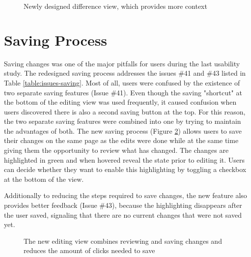 \begin{figure}[h!]
 \centering
 \caption{Newly designed difference view, which provides more context}
 \label{fig:diff-split}
\end{figure}

\section{Saving Process}
Saving changes was one of the major pitfalls for users during the last usability study. The redesigned saving process addresses the issues \#41 and \#43 listed in Table \ref{table:issues-saving}. Most of all, users were confused by the existence of two separate saving features (Issue \#41). Even though the saving "shortcut" at the bottom of the editing view was used frequently, it caused confusion when users discovered there is also a second saving button at the top. For this reason, the two separate saving features were combined into one by trying to maintain the advantages of both. The new saving process (Figure \ref{fig:highlighted-changes}) allows users to save their changes on the same page as the edits were done while at the same time giving them the opportunity to review what has changed. The changes are highlighted in green and when hovered reveal the state prior to editing it. Users can decide whether they want to enable this highlighting by toggling a checkbox at the bottom of the view.

Additionally to reducing the steps required to save changes, the new feature also provides better feedback (Issue \#43), because the highlighting disappears after the user saved, signaling that there are no current changes that were not saved yet.



\begin{figure}[h!]
 \centering
 \caption{The new editing view combines reviewing and saving changes and reduces the amount of clicks needed to save}
 \label{fig:highlighted-changes}
\end{figure}

